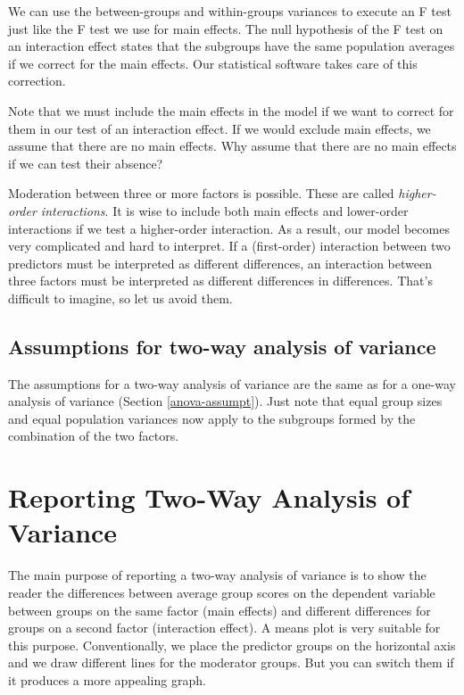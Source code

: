 \documentclass[a4paper]{book}
\theoremstyle{definition}
\theoremstyle{definition}
\theoremstyle{definition}
\theoremstyle{remark}
\begin{document}
We can use the between-groups and within-groups variances to execute an
F test just like the F test we use for main effects. The null hypothesis
of the F test on an interaction effect states that the subgroups have
the same population averages if we correct for the main effects. Our
statistical software takes care of this correction.

Note that we must include the main effects in the model if we want to
correct for them in our test of an interaction effect. If we would
exclude main effects, we assume that there are no main effects. Why
assume that there are no main effects if we can test their absence?

Moderation between three or more factors is possible. These are called
\emph{higher-order interactions}. It is wise to include both main
effects and lower-order interactions if we test a higher-order
interaction. As a result, our model becomes very complicated and hard to
interpret. If a (first-order) interaction between two predictors must be
interpreted as different differences, an interaction between three
factors must be interpreted as different differences in differences.
That's difficult to imagine, so let us avoid them.

\subsection{Assumptions for two-way analysis of
variance}\label{assumptions-for-two-way-analysis-of-variance}

The assumptions for a two-way analysis of variance are the same as for a
one-way analysis of variance (Section \ref{anova-assumpt}). Just note
that equal group sizes and equal population variances now apply to the
subgroups formed by the combination of the two factors.

\section{Reporting Two-Way Analysis of
Variance}\label{reporting-two-way-analysis-of-variance}

The main purpose of reporting a two-way analysis of variance is to show
the reader the differences between average group scores on the dependent
variable between groups on the same factor (main effects) and different
differences for groups on a second factor (interaction effect). A means
plot is very suitable for this purpose. Conventionally, we place the
predictor groups on the horizontal axis and we draw different lines for
the moderator groups. But you can switch them if it produces a more
appealing graph.
\end{document}
